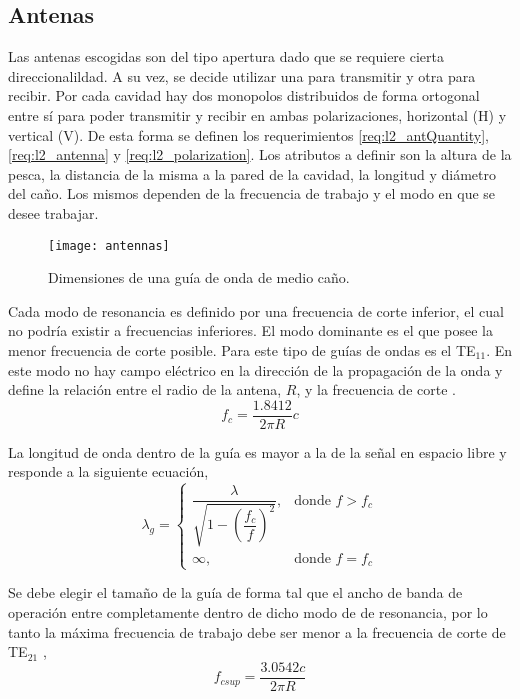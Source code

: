 \subsection{Antenas}

Las antenas escogidas son del tipo apertura dado que se requiere cierta direccionalildad. A su vez, se decide utilizar una para transmitir y otra para recibir. Por cada cavidad hay dos monopolos distribuidos de forma ortogonal entre sí para poder transmitir y recibir en ambas polarizaciones, horizontal (H) y vertical (V). De esta forma se definen los requerimientos \ref{req:l2_antQuantity}, \ref{req:l2_antenna} y \ref{req:l2_polarization}. Los atributos a definir son la altura de la pesca, la distancia de la misma a la pared de la cavidad, la longitud y diámetro del caño. Los mismos dependen de la frecuencia de trabajo y el modo en que se desee trabajar.

\begin{figure}
 \centering
 \texttt{[image: antennas]}
 \caption{Dimensiones de una guía de onda de medio caño.}
 \label{fig:antennas}
\end{figure}

Cada modo de resonancia es definido por una frecuencia de corte inferior, el cual no podría existir a frecuencias inferiores. El modo dominante es el que posee la menor frecuencia de corte posible. Para este tipo de guías de ondas es el TE$_{11}$. En este modo no hay campo eléctrico en la dirección de la propagación de la onda y define la relación entre el radio de la antena, $R$, y la frecuencia de corte \cite{circularWaveguides}.
\begin{equation} \label{eq:freqInf}
  f_c = \dfrac{1.8412}{2\pi R} c
\end{equation}

La longitud de onda dentro de la guía es mayor a la de la señal en espacio libre y responde a la siguiente ecuación,
\begin{equation} \label{eq:lambdaInGuide}
\lambda_g = \begin{cases} \dfrac{\lambda}{\sqrt{1 - (\dfrac{f_c}{f})^2}}, & \mbox{donde } f > f_c \\ \infty, & \mbox{donde } f = f_c \end{cases}
\end{equation}

Se debe elegir el tamaño de la guía de forma tal que el ancho de banda de operación entre completamente dentro de dicho modo de de resonancia, por lo tanto la máxima frecuencia de trabajo debe ser menor a la frecuencia de corte de TE$_{21}$ \cite{circularWaveguides},
\begin{equation} \label{eq:freqSup}
  f_{csup} = \dfrac{3.0542 c}{2\pi R}
\end{equation}

